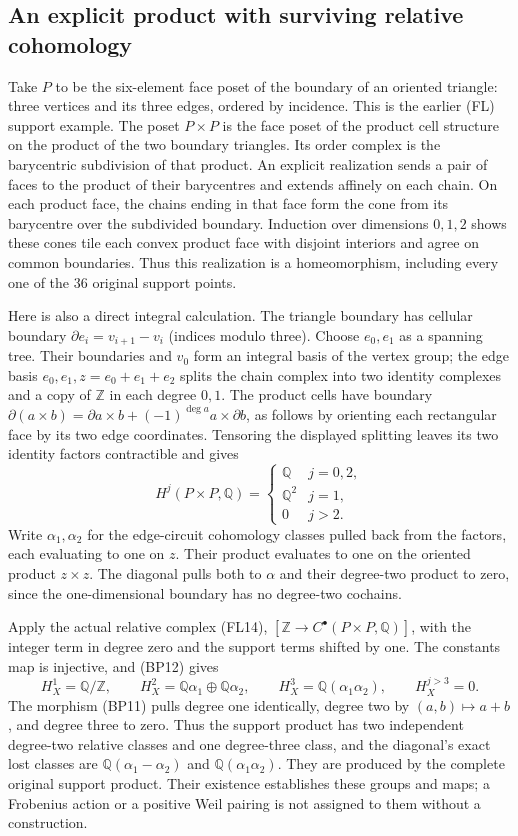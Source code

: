 \documentclass[11pt,a4paper]{article}
\theoremstyle{definition}\newtheorem{definition}[theorem]{Definition}
\begin{document}
\subsection{An explicit product with surviving relative cohomology}

Take $P$ to be the six-element face poset of the boundary of an
oriented triangle: three vertices and its three edges, ordered by
incidence. This is the earlier (FL) support example. The poset
$P\times P$ is the face poset of the product cell structure on
the product of the two boundary triangles. Its order complex is
the barycentric subdivision of that product. An explicit realization
sends a pair of faces to the product of their barycentres and extends
affinely on each chain. On each product face, the chains ending in
that face form the cone from its barycentre over the subdivided
boundary. Induction over dimensions $0,1,2$ shows these cones tile
each convex product face with disjoint interiors and agree on common
boundaries. Thus this realization is a homeomorphism, including every
one of the $36$ original support points.

Here is also a direct integral calculation. The triangle boundary
has cellular boundary $\partial e_i=v_{i+1}-v_i$ (indices modulo
three). Choose $e_0,e_1$ as a spanning tree. Their boundaries and
$v_0$ form an integral basis of the vertex group; the edge basis
$e_0,e_1,z=e_0+e_1+e_2$ splits the chain complex into two identity
complexes and a copy of $\mathbb Z$ in each degree $0,1$.
The product cells have boundary
$\partial(a\times b)=\partial a\times b+(-1)^{\deg a}a\times\partial b$,
as follows by orienting each rectangular face by its two edge
coordinates. Tensoring the displayed splitting leaves its two
identity factors contractible and gives
\[
 H^j(P\times P,\mathbb Q)=
 \begin{cases}\mathbb Q&j=0,2,\\\mathbb Q^2&j=1,\\0&j>2.\end{cases}
 \tag{BP12}
\]
Write $\alpha_1,\alpha_2$ for the edge-circuit cohomology classes
pulled back from the factors, each evaluating to one on $z$.
Their product evaluates to one on the oriented product $z\times z$.
The diagonal pulls both to $\alpha$ and their degree-two product to
zero, since the one-dimensional boundary has no degree-two cochains.

Apply the actual relative complex (FL14),
$[\mathbb Z\to C^\bullet(P\times P,\mathbb Q)]$, with the
integer term in degree zero and the support terms shifted by one.
The constants map is injective, and (BP12) gives
\[
 H_X^1=\mathbb Q/\mathbb Z,\qquad
 H_X^2=\mathbb Q\alpha_1\oplus\mathbb Q\alpha_2,\qquad
 H_X^3=\mathbb Q(\alpha_1\alpha_2),\qquad H_X^{j>3}=0.
 \tag{BP13}
\]
The morphism (BP11) pulls degree one identically, degree two by
$(a,b)\mapsto a+b$, and degree three to zero. Thus the support
product has two independent degree-two relative classes and one
degree-three class, and the diagonal's exact lost classes are
$\mathbb Q(\alpha_1-\alpha_2)$ and $\mathbb Q(\alpha_1\alpha_2)$.
They are produced by the complete original support product. Their
existence establishes these groups and maps; a Frobenius action or
a positive Weil pairing is not assigned to them without a construction.
\end{document}
